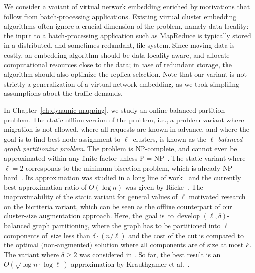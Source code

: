 We consider a variant of virtual network embedding enriched by motivations that follow from batch-processing applications.
Existing virtual cluster embedding algorithms often ignore a crucial dimension of the problem, namely data locality:
the input to a batch-processing application such as MapReduce is typically stored in a distributed,
and sometimes redundant, file system. Since moving
data is costly, an embedding algorithm should be data locality aware,
and allocate computational resources close to the data; in case of redundant storage, the algorithm should also optimize the replica selection.
Note that our variant is not strictly a generalization of a virtual network embedding, as we took simplifing assumptions about the traffic demands.

\medskip

In Chapter~\ref{ch:dynamic-mapping}, we study an online balanced partition problem.
The static offline version of the problem, i.e., a problem variant where
migration is not allowed, where all requests are known in advance, and where
the goal is to find best node assignment to $\ell$~clusters, is known as the
\emph{$\ell$-balanced graph partitioning problem}. The problem is 
NP-complete, and cannot even be approximated within any finite factor unless P
= NP~\cite{AndRae06}.  The static
variant where $\ell = 2$ corresponds to the minimum bisection problem, which
is already NP-hard~\cite{GaJoSt76}.
Its approximation was studied in a long
line of work~\cite{SarVaz95,ArKaKa99,FeKrNi00,FeiKra02,KraFei06,Raec08} and
the currently best approximation ratio of $O(\log n)$ was given by
R{\"{a}}cke~\cite{Raec08}.
The inaproximability of the static variant for general values of $\ell$
motivated research on the bicriteria variant, which can be seen as the offline
counterpart of our cluster-size augmentation approach. Here, the~goal
is~to~develop $(\ell,\delta)$-balanced graph partitioning, where the graph has
to be partitioned into $\ell$ components of~size less than $\delta \cdot (n /
\ell)$ and the cost of the cut is compared to the optimal (non-augmented)
solution where all components are of size at most $k$. The variant where
$\delta \geq 2$ was considered in
\cite{LeMaTr90,SimTen97,EvNaRS00,EvNaRS99,KrNaSc09}. So far, the best result is
an $O(\!\sqrt{\log n \cdot \log \ell})$-approximation by Krauthgamer et
al.~\cite{KrNaSc09}.

